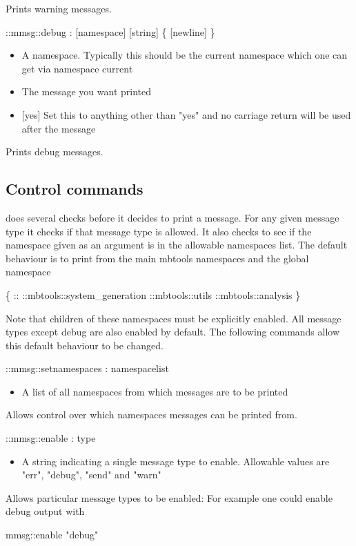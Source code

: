 Prints warning messages.
\begin{code} 
  ::mmsg::debug : [namespace] [string] \{ [newline] \}
\end{code}
\begin{itemize}
\item {} A namespace. Typically this should be the
  current namespace which one can get via namespace current
\item {} The message you want printed
\item {} [yes] Set this to anything other than "yes" and no
  carriage return will be used after the message
\end{itemize}
Prints debug messages.

\subsection{Control commands}

 does several checks before it decides to print a
message. For any given message type it checks if that message type is
allowed. It also checks to see if the namespace given as an argument
is in the allowable namespaces list. The default behaviour is to print
from the main mbtools namespaces and the global namespace

\begin{code}
  \{ :: ::mbtools::system_generation ::mbtools::utils ::mbtools::analysis \}
\end{code}
  
Note that children of these namespaces must be explicitly enabled. All
message types except debug are also enabled by default. The following
commands allow this default behaviour to be changed.

\begin{code} 
  ::mmsg::setnamespaces : namespacelist
\end{code}
\begin{itemize}
\item {} A list of all namespaces from which messages
  are to be printed
\end{itemize}
Allows control over which namespaces messages can be printed from.
\begin{code}     
  ::mmsg::enable : type
\end{code}
\begin{itemize}
\item {} A string indicating a single message type to
  enable. Allowable values are "err", "debug", "send" and "warn"
\end{itemize}
Allows particular message types to be enabled: For example one could
enable debug output with
\begin{code}
       mmsg::enable "debug" 
\end{code}

